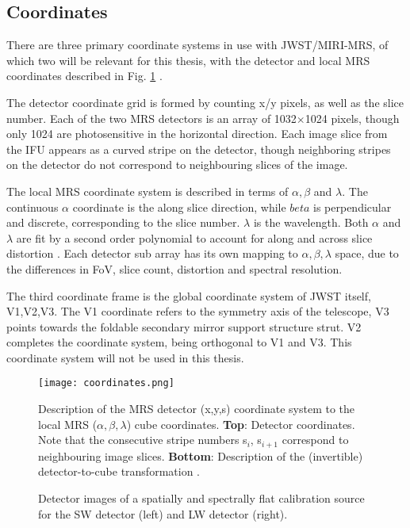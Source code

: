 \subsection{Coordinates}
There are three primary coordinate systems in use with JWST/MIRI-MRS, of which two will be relevant for this thesis, with the detector and local MRS coordinates described in Fig. \ref{fig:mrscoords} \parencite{Argyriou2020}.

The detector coordinate grid is formed by counting x/y pixels, as well as the slice number.
Each of the two MRS detectors is an array of 1032$\times$1024 pixels, though only 1024 are photosensitive in the horizontal direction.
Each image slice from the IFU appears as a curved stripe on the detector, though neighboring stripes on the detector do not correspond to neighbouring slices of the image. 

The local MRS coordinate system is described in terms of $\alpha,\beta$ and $\lambda$. The continuous $\alpha$ coordinate is the along slice direction, while $beta$ is perpendicular and discrete, corresponding to the slice number. $\lambda$ is the wavelength. Both $\alpha$ and $\lambda$ are fit by a second order polynomial to account for along and across slice distortion \parencite{MIRI6}. Each detector sub array has its own mapping to $\alpha,\beta,\lambda$ space, due to the differences in FoV, slice count, distortion and spectral resolution.

The third coordinate frame is the global coordinate system of JWST itself, V1,V2,V3. The V1 coordinate refers to the symmetry axis of the telescope, V3 points towards the foldable secondary mirror support structure strut. V2 completes the coordinate system, being orthogonal to V1 and V3. This coordinate system will not be used in this thesis.

\begin{figure}[t]
	\texttt{[image: coordinates.png]}
	\caption{Description of the MRS detector (x,y,s) coordinate system to the local MRS ($\alpha,\beta,\lambda$) cube coordinates. \textbf{Top}: Detector coordinates. Note that the consecutive stripe numbers s$_{i}$, s$_{i+1}$ correspond to neighbouring image slices. \textbf{Bottom}: Description of the (invertible) detector-to-cube transformation \parencite{Argyriou2020}.}
	\label{fig:mrscoords}	
\end{figure}

\begin{figure}[t]
	\caption{Detector images of a spatially and spectrally flat calibration source for the SW detector (left) and LW detector (right).}
	\label{fig:flatfield}
\end{figure}
